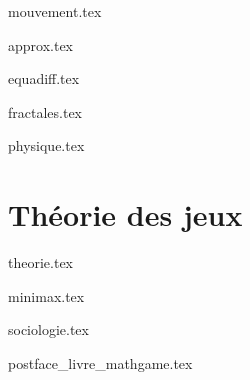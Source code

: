 \documentclass[10pt,twoside,openright]{report}
\begin{document}
{mouvement.tex}

{approx.tex}

{equadiff.tex}

{fractales.tex}

{physique.tex}


\clearemptydoublepage
\part{Théorie des jeux}

{theorie.tex}

{minimax.tex}

{sociologie.tex}


\clearemptydoublepage

{postface_livre_mathgame.tex}


~\vfill
\bigskip

\end{document}
